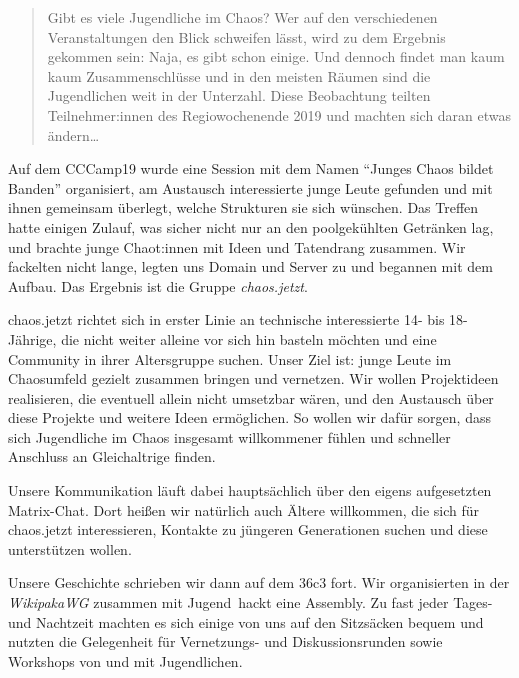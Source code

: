 \begin{DSarticle}[
    title={chaos.jetzt},
    author=ruru4143, email=ruru-cj-ds@r3.at,
    head=chaos.jetzt,
    tocentry=chaos.jetzt,
]

\begin{abstract}
Gibt es viele Jugendliche im Chaos?
Wer auf den verschiedenen Veranstaltungen den Blick schweifen lässt, wird zu dem Ergebnis gekommen sein:
Naja, es gibt schon einige.
Und dennoch findet man kaum kaum Zusammenschlüsse und in den meisten Räumen sind die Jugendlichen weit in der Unterzahl.
Diese Beobachtung teilten Teilnehmer:innen des Regiowochenende 2019 und machten sich daran etwas ändern\ldots
\end{abstract}


Auf dem CCCamp19 wurde eine Session mit dem Namen \enquote{Junges Chaos bildet Banden} organisiert, am Austausch interessierte junge Leute gefunden und mit ihnen gemeinsam überlegt, welche Strukturen sie sich wünschen.
Das Treffen hatte einigen Zulauf, was sicher nicht nur an den poolgekühlten Getränken lag, und brachte junge Chaot:innen mit Ideen und Tatendrang zusammen.
Wir fackelten nicht lange, legten uns Domain und Server zu und begannen mit dem Aufbau. Das Ergebnis ist die Gruppe \emph{chaos.jetzt}.

chaos.jetzt richtet sich in erster Linie an technische interessierte 14- bis 18-Jährige, die nicht weiter alleine vor sich hin basteln möchten und eine Community in ihrer Altersgruppe suchen.
Unser Ziel ist: junge Leute im Chaosumfeld gezielt zusammen bringen und vernetzen.
Wir wollen Projektideen realisieren, die eventuell allein nicht umsetzbar wären, und den Austausch über diese Projekte und weitere Ideen ermöglichen.
So wollen wir dafür sorgen, dass sich Jugendliche im Chaos insgesamt willkommener fühlen und schneller Anschluss an Gleichaltrige finden.

Unsere Kommunikation läuft dabei hauptsächlich über den eigens aufgesetzten Matrix-Chat.
Dort heißen wir natürlich auch Ältere willkommen, die sich für chaos.jetzt interessieren, Kontakte zu jüngeren Generationen suchen und diese unterstützen wollen.

Unsere Geschichte schrieben wir dann auf dem 36c3 fort. Wir organisierten in der \emph{WikipakaWG} zusammen mit Jugend~hackt eine Assembly.
Zu fast jeder Tages- und Nachtzeit machten es sich einige von uns auf den Sitzsäcken bequem und nutzten die Gelegenheit für Vernetzungs- und Diskussionsrunden sowie Workshops von und mit Jugendlichen.


\end{DSarticle}
